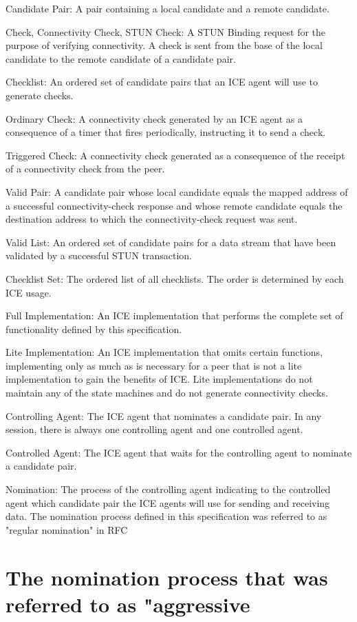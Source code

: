 \documentclass{article}
\begin{document}
Candidate Pair:  A pair containing a local candidate and a remote candidate.

Check, Connectivity Check, STUN Check:  A STUN Binding request for the purpose of verifying connectivity.  A check is sent from the base of the local candidate to the remote candidate of a candidate pair.

Checklist:  An ordered set of candidate pairs that an ICE agent will use to generate checks.

Ordinary Check:  A connectivity check generated by an ICE agent as a consequence of a timer that fires periodically, instructing it to send a check.

Triggered Check:  A connectivity check generated as a consequence of the receipt of a connectivity check from the peer.

Valid Pair:  A candidate pair whose local candidate equals the mapped address of a successful connectivity-check response and whose remote candidate equals the destination address to which the connectivity-check request was sent.

Valid List:  An ordered set of candidate pairs for a data stream that have been validated by a successful STUN transaction.

Checklist Set:  The ordered list of all checklists.  The order is determined by each ICE usage.

Full Implementation:  An ICE implementation that performs the complete set of functionality defined by this specification.

Lite Implementation:  An ICE implementation that omits certain functions, implementing only as much as is necessary for a peer that is not a lite implementation to gain the benefits of ICE. Lite implementations do not maintain any of the state machines and do not generate connectivity checks.

Controlling Agent:  The ICE agent that nominates a candidate pair. In any session, there is always one controlling agent and one controlled agent.

Controlled Agent:  The ICE agent that waits for the controlling agent to nominate a candidate pair.

Nomination:  The process of the controlling agent indicating to the controlled agent which candidate pair the ICE agents will use for sending and receiving data.  The nomination process defined in this specification was referred to as "regular nomination" in RFC

\section{The nomination process that was referred to as "aggressive}
\end{document}
